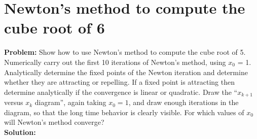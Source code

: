 \newpage
\section{Newton's method to compute the cube root of 6}
\label{sec:newton_s_method_to_compute_the_cube_root_of_6}

\textbf{Problem:}
Show how to use Newton’s method to compute the cube root
of 5. Numerically carry out the first 10 iterations of Newton’s method, using $x_{0}$ = 1. 
Analytically determine the fixed points of the Newton iteration and determine whether they are attracting or repelling.
If a fixed point is attracting then determine analytically if the convergence is linear or quadratic.
Draw the “$x_{k+1}$ versus $x_{k}$ diagram”, again taking $x_{0} = 1$, and draw enough iterations in the diagram, so that the long time behavior is clearly visible. 
For which values of $x_{0}$ will Newton’s method converge?
\\
\textbf{Solution:}

\newpage
